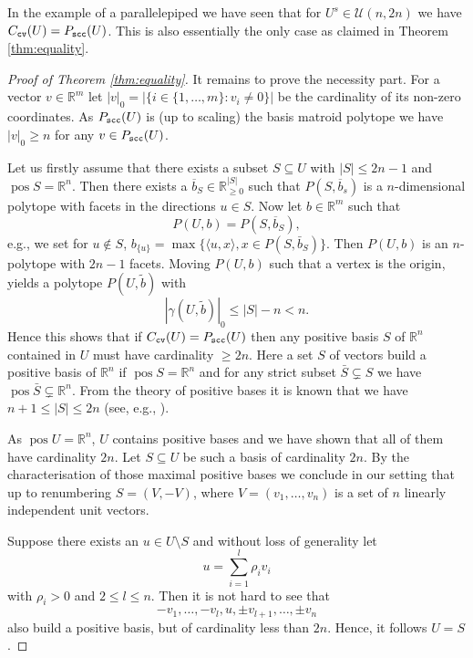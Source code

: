 \documentclass[11pt, a4paper, twoside, reqno]{amsart}
\DeclareMathOperator*{\pos}{pos}
\newcommand{\R}{\mathbb{R}}
\newtheorem{theorem}{Theorem}[section] %
\theoremstyle{definition}
\theoremstyle{remark}
\newcommand{\scc}{{\tt scc}}
\newcommand{\cv}{{\tt cv}}
\newcommand{\ov}{\overline}
\numberwithin{equation}{section}
\begin{document}
In the example of a parallelepiped we have seen that for
$U^s\in\mathcal{U}(n,2n)$ we have $C_\cv(U)=P_\scc(U)$. This is also
essentially the only case as claimed in Theorem \ref{thm:equality}.
\begin{proof}[Proof of Theorem \ref{thm:equality}] It remains to prove the necessity part. For a vector $v\in\R^m$ let $|v|_0=|\{i\in\{1,\dots,m\}
  :v_i\ne 0\}|$ be the cardinality of its non-zero coordinates. As 
  $P_\scc(U)$ is (up to scaling) the basis matroid polytope we have
  $|v|_0\geq n$ for any $v\in P_\scc(U)$.

  Let us firstly assume that there
  exists a subset  $S\subseteq U$ with $|S|\leq 2n-1$
  and $\pos S=\R^n$. Then there exists a  $\ov b_S\in\R^{|S|}_{\geq 0}$ such that
  $P(S,\ov b_s)$ is a $n$-dimensional polytope with facets in the
  directions $u\in S$. Now let $b\in\R^m$ such that
   \begin{equation*}
          P(U,b)=P(S,\ov b_S), 
   \end{equation*}
e.g., we set for $u\notin S$, $b_{\{u\}}=\max\{\langle u, x\rangle,
x\in P(S,\bar b_S)\}$. Then
$P(U,b)$ is an $n$-polytope with $2n-1$ facets. Moving $P(U,b)$ such
that a vertex is the origin, yields a polytope $P(U,\widetilde{b})$ with
\begin{equation*}
       |\gamma(U,\widetilde{b})|_0 \leq |S|-n <n.
     \end{equation*}
Hence this shows that if $C_\cv(U)=P_\scc(U)$ then any positive basis
$S$ of $\R^n$ contained in $U$ must have cardinality $\geq 2n$. Here
a set $S$ of vectors
build a positive basis of $\R^n$ if $\pos S=\R^n$ and 
for any strict subset $\bar S\subsetneq S$ we have $\pos \bar S\subsetneq\R^n$.    From the theory of positive bases it is known that we have $n+1\leq |S|\leq
2n$ (see, e.g.,  \cite[Theorem 6.6]{Regis2015a}).

As $\pos U=\R^n$, $U$ contains positive bases and
we have shown that all of them have cardinality $2n$. Let $S\subseteq
U$ be such a basis of cardinality $2n$. By the characterisation of
those maximal positive bases \cite[Theorem 6.3]{Regis2015a} we conclude in our setting that up to
renumbering $S=(V,-V)$, where $V=(v_1,\dots,v_n)$ is a set of $n$
linearly independent unit vectors.  

Suppose there exists an $u\in U\setminus S$ and without loss of
generality let
\begin{equation*}
            u=\sum_{i=1}^l \rho_i v_i 
          \end{equation*}
          with $\rho_i>0$ and $2\leq l\leq n$. Then it is not hard to see that
          \begin{equation*}
            -v_1,\dots,-v_l, u ,\pm v_{l+1},\dots,\pm  v_n
          \end{equation*}
          also build a positive basis, but of cardinality less than $2n$.
Hence, it follows $U=S$.        
\end{proof}  
\end{document}
